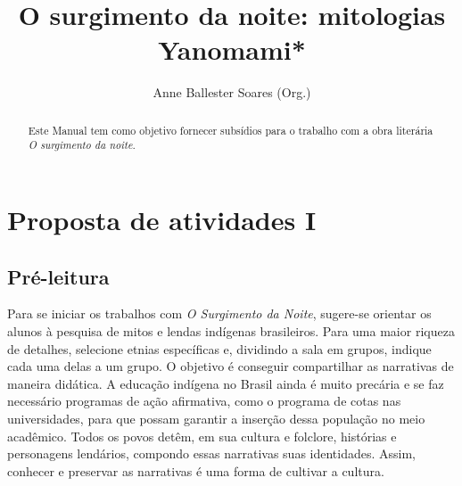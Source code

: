 \documentclass[12pt]{extarticle}
\begin{document}
\newcommand{\AutorLivro}{Anne Ballester Soares (Org.)}
\newcommand{\TituloLivro}{O surgimento da noite: mitologias Yanomami*}
\newcommand{\Tema}{Ficção, mistério e fantasia}
\newcommand{\Genero}{Mitologia indígena}
\newcommand{\imagemCapa}{./images/PNLD0029-01.png}
\newcommand{\issnppub}{---}
\newcommand{\issnepub}{---}
\newcommand{\colaborador}{\textbf{Fulano de Tal} é uma pessoa incrível e vai fazer um bom serviço.}


\title{\TituloLivro}
\author{\AutorLivro}
\def\authornotes{\colaborador}

\date{}
\maketitle




\begin{abstract}
Este Manual tem como objetivo fornecer subsídios para o trabalho com a
obra literária \emph{O surgimento da noite.}
\end{abstract}


\tableofcontents
\section{Proposta de atividades I}

\subsection{Pré-leitura}



Para se iniciar os trabalhos com \emph{O Surgimento
da Noite}, sugere-se orientar os alunos à pesquisa de mitos e lendas
indígenas brasileiros. Para uma maior riqueza de detalhes, selecione
etnias específicas e, dividindo a sala em grupos, indique cada uma delas
a um grupo. O objetivo é conseguir compartilhar as narrativas de maneira
didática. A educação indígena no Brasil ainda é muito precária e se faz
necessário programas de ação afirmativa, como o programa de cotas nas
universidades, para que possam garantir a inserção dessa população no
meio acadêmico. Todos os povos detêm, em sua cultura e folclore,
histórias e personagens lendários, compondo essas narrativas suas
identidades. Assim, conhecer e preservar as narrativas é uma forma de
cultivar a cultura.
\end{document}
